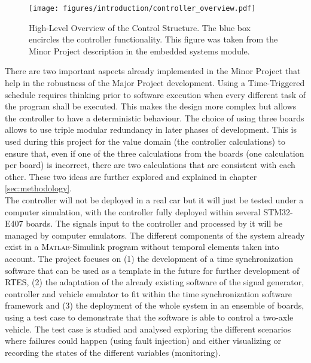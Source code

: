 \documentclass[table,xcdraw]{article}
\begin{document}
\begin{figure}[h!]
    \centering
    \texttt{[image: figures/introduction/controller\_overview.pdf]}
    \caption{High-Level Overview of the Control Structure. The blue box encircles the controller functionality. This figure was taken from the Minor Project description in the embedded systems module.}
    \label{fig:control_structure}
\end{figure}

 There are two important aspects already implemented in the Minor Project that help in the robustness of the Major Project development. Using a Time-Triggered schedule requires thinking prior to software execution when every different task of the program shall be executed. This makes the design more complex but allows the controller to have a deterministic behaviour. The choice of using three boards allows to use triple modular redundancy in later phases of development. This is used during this project for the value domain (the controller calculations) to ensure that, even if one of the three calculations from the boards (one calculation per board) is incorrect, there are two calculations that are consistent with each other. These two ideas are further explored and explained in chapter \ref{sec:methodology}.\\

The controller will not be deployed in a real car but it will just be tested under a computer simulation, with the controller fully deployed within several STM32-E407 boards. The signals input to the controller and processed by it will be managed by computer emulators. The different components of the system already exist in a \textsc{Matlab}-Simulink program without temporal elements taken into account. The project focuses on (1) the development of a time synchronization software that can be used as a template in the future for further development of RTES, (2) the adaptation of the already existing software of the signal generator, controller and vehicle emulator to fit within the time synchronization software framework and (3) the deployment of the whole system in an ensemble of boards, using a test case to demonstrate that the software is able to control a two-axle vehicle. The test case is studied and analysed exploring the different scenarios where failures could happen (using fault injection) and either visualizing or recording the states of the different variables (monitoring).\\
\end{document}
